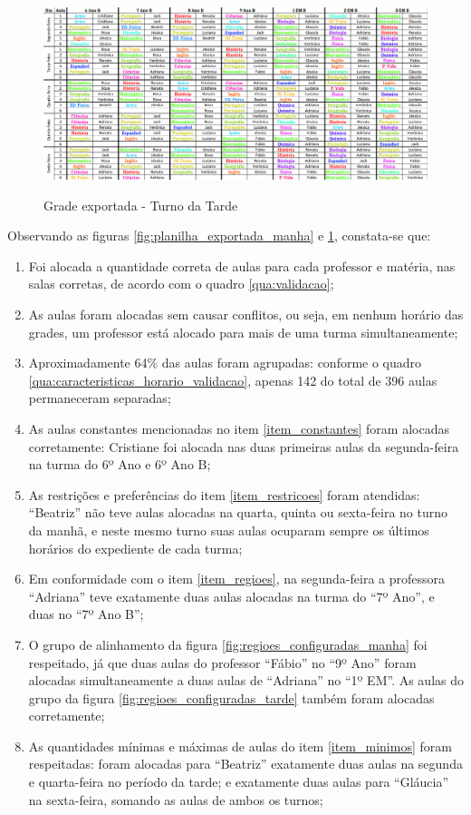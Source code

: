 \begin{figure}[p]
	\centering
	\caption{Grade exportada - Turno da Tarde}
	\includegraphics[width=1\textwidth]{./dados/figuras/planilha_exportada_tarde}
	\label{fig:planilha_exportada_tarde}
\end{figure}

\newpage
Observando as figuras \ref{fig:planilha_exportada_manha} e \ref{fig:planilha_exportada_tarde}, constata-se que:

\begin{enumerate}
	\item Foi alocada a quantidade correta de aulas para cada professor e matéria, nas salas corretas, de acordo com o quadro \ref{qua:validacao};
	\item As aulas foram alocadas sem causar conflitos, ou seja, em nenhum horário das grades, um professor está alocado para mais de uma turma simultaneamente;
	\item Aproximadamente 64\% das aulas foram agrupadas: conforme o quadro \ref{qua:caracteristicas_horario_validacao}, apenas 142 do total de 396 aulas permaneceram separadas;
	\item As aulas constantes mencionadas no item \ref{item_constantes} foram alocadas corretamente: Cristiane foi alocada nas duas primeiras aulas da segunda-feira na turma do 6º Ano e 6º Ano B;
	\item As restrições e preferências do item \ref{item_restricoes} foram atendidas: ``Beatriz'' não teve aulas alocadas na quarta, quinta ou sexta-feira no turno da manhã, e neste mesmo turno suas aulas ocuparam sempre os últimos horários do expediente de cada turma;
	\item Em conformidade com o item \ref{item_regioes}, na segunda-feira a professora ``Adriana'' teve exatamente duas aulas alocadas na turma do ``7º Ano'', e duas no ``7º Ano B'';
	\item O grupo de alinhamento da figura \ref{fig:regioes_configuradas_manha} foi respeitado, já que duas aulas do professor ``Fábio'' no ``9º Ano'' foram alocadas simultaneamente a duas aulas de ``Adriana'' no ``1º EM''. As aulas do grupo da figura \ref{fig:regioes_configuradas_tarde} também foram alocadas corretamente;
	\item As quantidades mínimas e máximas de aulas do item \ref{item_minimos} foram respeitadas: foram alocadas para ``Beatriz'' exatamente duas aulas na segunda e quarta-feira no período da tarde; e exatamente duas aulas para ``Gláucia'' na sexta-feira, somando as aulas de ambos os turnos;
\end{enumerate}      


